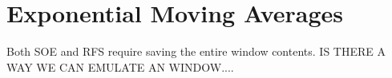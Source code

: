 


\section{Exponential Moving Averages}
Both SOE and RFS require saving the entire window contents. IS THERE A WAY WE CAN EMULATE AN WINDOW....


